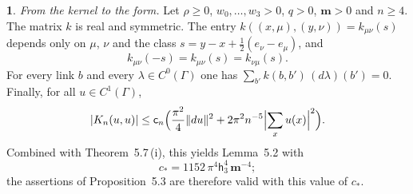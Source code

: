 \documentclass[11pt]{amsart}
\newcommand{\namedhead}{}
\theoremstyle{definition}
\newtheorem*{namedinner}{\namedhead}
\newenvironment{named}[1]{\renewcommand{\namedhead}{#1}\begin{namedinner}}{\end{namedinner}}
\begin{document}
\begin{named}{Lemma 5.8}
\emph{From the kernel to the form.}
Let $\rho\ge0$, $w_0,\dots,w_3>0$, $q>0$, $\mathbf m>0$ and $n\ge4$.
The matrix $k$ is real and symmetric.
The entry $k((x,\mu),(y,\nu))=k_{\mu\nu}(s)$ depends only on $\mu$, $\nu$ and the class $s=y-x+\frac12(e_\nu-e_\mu)$, and
\begin{equation*}
k_{\mu\nu}(-s)=k_{\mu\nu}(s)=k_{\nu\mu}(s).
\end{equation*}
For every link $b$ and every $\lambda\in C^0(\Gamma)$ one has $\sum_{b'}k(b,b')\,(d\lambda)(b')=0$.
Finally, for all $u\in C^1(\Gamma)$,
\begin{equation*}
|K_n(u,u)|\le\mathsf c_n\Bigl(\frac{\pi^2}{4}\|du\|^2+2\pi^2n^{-5}\Bigl|\sum_xu(x)\Bigr|^2\Bigr).
\end{equation*}
Combined with Theorem~5.7\,(i), this yields Lemma~5.2 with
\begin{equation*}
c_*=1152\,\pi^4\mathsf h_3^4\,\mathbf m^{-4};
\end{equation*}
the assertions of Proposition~5.3 are therefore valid with this value of $c_*$.
\end{named}
\end{document}

